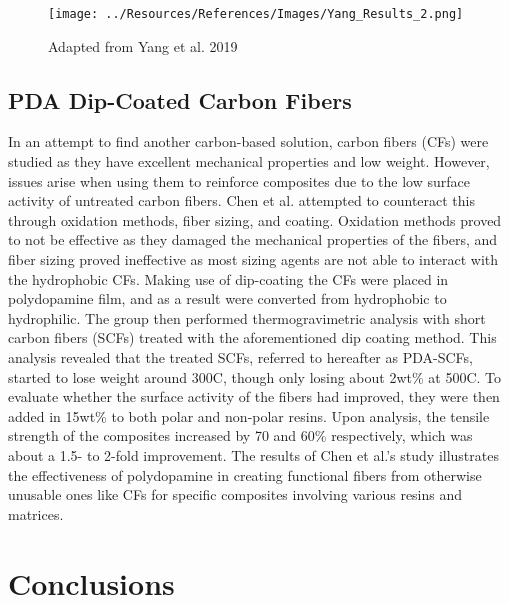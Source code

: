 \documentclass[12pt]{article}
\begin{document}
\begin{multicols}{2}
\begin{figure}[H]
    \centering
    \texttt{[image: ../Resources/References/Images/Yang\_Results\_2.png]}
    \caption{\scriptsize{Adapted from Yang et al. 2019 \citep{Yang2019}}}
    \label{fig:Yang_Results_2}
\end{figure}

\subsection{PDA Dip-Coated Carbon Fibers}

\indent In an attempt to find another carbon-based solution, carbon fibers (CFs) were studied as they have excellent mechanical properties and low weight. However, issues arise when using them to reinforce composites due to the low surface activity of untreated carbon fibers. Chen et al. \citep{ShushengChen2014} attempted to counteract this through oxidation methods, fiber sizing, and coating. Oxidation methods proved to not be effective as they damaged the mechanical properties of the fibers, and fiber sizing proved ineffective as most sizing agents are not able to interact with the hydrophobic CFs. Making use of dip-coating the CFs were placed in polydopamine film, and as a result were converted from hydrophobic to hydrophilic. \citep{ShushengChen2014} The group then performed thermogravimetric analysis with short carbon fibers (SCFs) treated with the aforementioned dip coating method. This analysis revealed that the treated SCFs, referred to hereafter as PDA-SCFs, started to lose weight around 300\degree C, though only losing about 2wt\% at 500\degree C. \citep{ShushengChen2014} To evaluate whether the surface activity of the fibers had improved, they were then added in 15wt\% to both polar and non-polar resins. Upon analysis, the tensile strength of the composites increased by 70 and 60\% respectively, which was about a 1.5- to 2-fold improvement. \citep{ShushengChen2014} The results of Chen et al.'s \citep{ShushengChen2014} study illustrates the effectiveness of polydopamine in creating functional fibers from otherwise unusable ones like CFs for specific composites involving various resins and matrices. 

\section{Conclusions}


\end{multicols}
\end{document}
